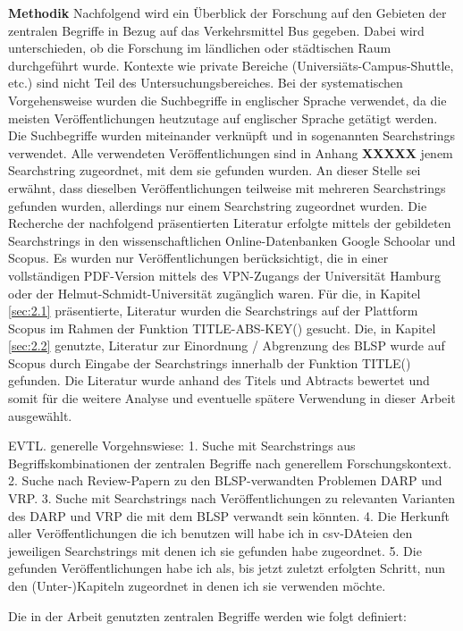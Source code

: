 \textbf{Methodik} Nachfolgend wird ein Überblick der Forschung auf den Gebieten der zentralen Begriffe in Bezug auf das Verkehrsmittel Bus gegeben. Dabei wird unterschieden, ob die Forschung im ländlichen oder städtischen Raum durchgeführt wurde. Kontexte wie private Bereiche (Universiäts-Campus-Shuttle, etc.) sind nicht Teil des Untersuchungsbereiches. Bei der systematischen Vorgehensweise wurden die Suchbegriffe in englischer Sprache verwendet, da die meisten Veröffentlichungen heutzutage auf englischer Sprache getätigt werden. Die Suchbegriffe wurden miteinander verknüpft und in sogenannten Searchstrings verwendet. Alle verwendeten Veröffentlichungen sind in Anhang \textbf{XXXXX} jenem Searchstring zugeordnet, mit dem sie gefunden wurden. An dieser Stelle sei erwähnt, dass dieselben Veröffentlichungen teilweise mit mehreren Searchstrings gefunden wurden, allerdings nur einem Searchstring zugeordnet wurden. Die Recherche der nachfolgend präsentierten Literatur erfolgte mittels der gebildeten Searchstrings in den wissenschaftlichen Online-Datenbanken Google Schoolar und Scopus. Es wurden nur Veröffentlichungen berücksichtigt, die in einer vollständigen PDF-Version mittels des VPN-Zugangs der Universität Hamburg oder der Helmut-Schmidt-Universität zugänglich waren. Für die, in Kapitel \ref{sec:2.1} präsentierte, Literatur wurden die Searchstrings auf der Plattform Scopus im Rahmen der Funktion \glqq TITLE-ABS-KEY()\grqq{} gesucht. Die, in Kapitel \ref{sec:2.2} genutzte, Literatur zur Einordnung / Abgrenzung des BLSP wurde auf Scopus durch Eingabe der Searchstrings innerhalb der Funktion \glqq TITLE()\grqq{} gefunden. Die Literatur wurde anhand des Titels und Abtracts bewertet und somit für die weitere Analyse und eventuelle spätere Verwendung in dieser Arbeit ausgewählt. 

EVTL. generelle Vorgehnswiese:
1. Suche mit Searchstrings aus Begriffskombinationen der zentralen Begriffe nach generellem Forschungskontext. 2. Suche nach Review-Papern zu den BLSP-verwandten Problemen DARP und VRP. 3. Suche mit Searchstrings nach Veröffentlichungen zu relevanten Varianten des DARP und VRP die mit dem BLSP verwandt sein könnten. 4. Die Herkunft aller Veröffentlichungen die ich benutzen will habe ich in csv-DAteien den jeweiligen Searchstrings mit denen ich sie gefunden habe zugeordnet. 5. Die gefunden Veröffentlichungen habe ich als, bis jetzt zuletzt erfolgten Schritt, nun den (Unter-)Kapiteln zugeordnet in denen ich sie verwenden möchte.


Die in der Arbeit genutzten zentralen Begriffe werden wie folgt definiert:

